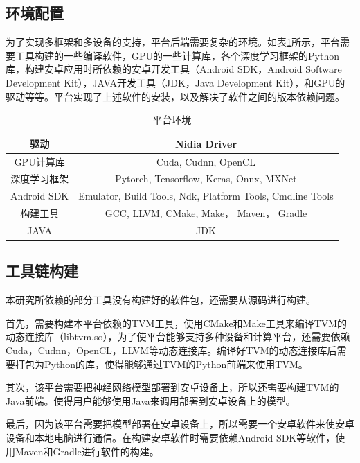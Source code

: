 \subsection{环境配置}

为了实现多框架和多设备的支持，平台后端需要复杂的环境。如表\ref{base_environment}所示，平台需要工具构建的一些编译软件，GPU的一些计算库，各个深度学习框架的Python库，构建安卓应用时所依赖的安卓开发工具（Android SDK，Android Software Development Kit），JAVA开发工具（JDK，Java Development Kit），和GPU的驱动等等。平台实现了上述软件的安装，以及解决了软件之间的版本依赖问题。

\begin{table}
    \centering
    \caption{平台环境}
    \label{base_environment}
    \begin{tabular}{c||c}
        \hline
        驱动         & Nidia Driver \\ \hline
        GPU计算库    & Cuda, Cudnn, OpenCL \\ \hline
        深度学习框架  & Pytorch, Tensorflow, Keras, Onnx, MXNet \\ \hline
        Android SDK & Emulator, Build Tools, Ndk, Platform Tools, Cmdline Tools \\ \hline
        构建工具     & GCC, LLVM, CMake, Make， Maven， Gradle \\ \hline
        JAVA        & JDK \\ \hline
    \end{tabular}
\end{table}


\subsection{工具链构建}

本研究所依赖的部分工具没有构建好的软件包，还需要从源码进行构建。

首先，需要构建本平台依赖的TVM工具，使用CMake和Make工具来编译TVM的动态连接库（libtvm.so），为了使平台能够支持多种设备和计算平台，还需要依赖Cuda，Cudnn，OpenCL，LLVM等动态连接库。编译好TVM的动态连接库后需要打包为Python的库，使得能够通过TVM的Python前端来使用TVM。

其次，该平台需要把神经网络模型部署到安卓设备上，所以还需要构建TVM的Java前端。使得用户能够使用Java来调用部署到安卓设备上的模型。

最后，因为该平台需要把模型部署在安卓设备上，所以需要一个安卓软件来使安卓设备和本地电脑进行通信。在构建安卓软件时需要依赖Android SDK等软件，使用Maven和Gradle进行软件的构建。

